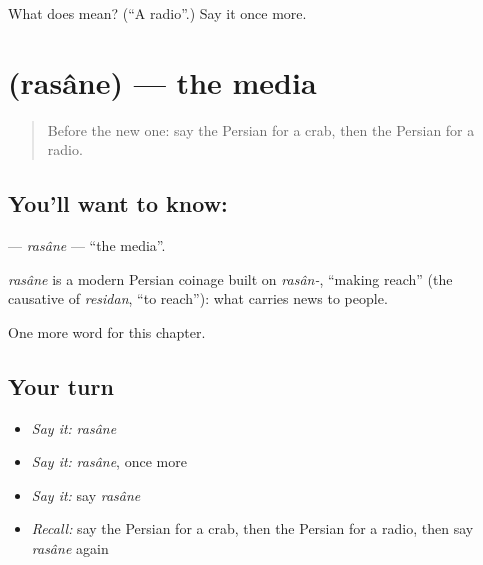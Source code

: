 \begin{tcolorbox}[breakable,colback=teal!4,colframe=teal!35!black,title={Before you move on}]
What does  mean? (\textquotedblleft{}A radio\textquotedblright{}.) Say it once more.
\end{tcolorbox}
\section[\texorpdfstring{\fa{رسانه} (rasâne)}{رسانه (rasâne)}]{ (rasâne) — the media}

\label{lesson:FA-C210-rasane}



\begin{quote}
Before the new one: say the Persian for a crab, then the Persian for a radio.
\end{quote}

\subsection*{You'll want to know: }
\textbf{} — \emph{rasâne} — \textquotedblleft{}the media\textquotedblright{}.

\begin{cousinweb}
\emph{rasâne} is a modern Persian coinage built on \emph{rasân-}, \textquotedblleft{}making reach\textquotedblright{} (the causative of \emph{residan}, \textquotedblleft{}to reach\textquotedblright{}): what carries news to people.
\end{cousinweb}

\begin{grammarlens}[title={What you've built}]
One more word for this chapter.
\end{grammarlens}

\subsection*{Your turn}
\begin{itemize}
\raggedright
  \item \emph{Say it:} \emph{rasâne}
  \item \emph{Say it:} \emph{rasâne}, once more
  \item \emph{Say it:} say \emph{rasâne}
  \item \emph{Recall:} say the Persian for a crab, then the Persian for a radio, then say \emph{rasâne} again
\end{itemize}

